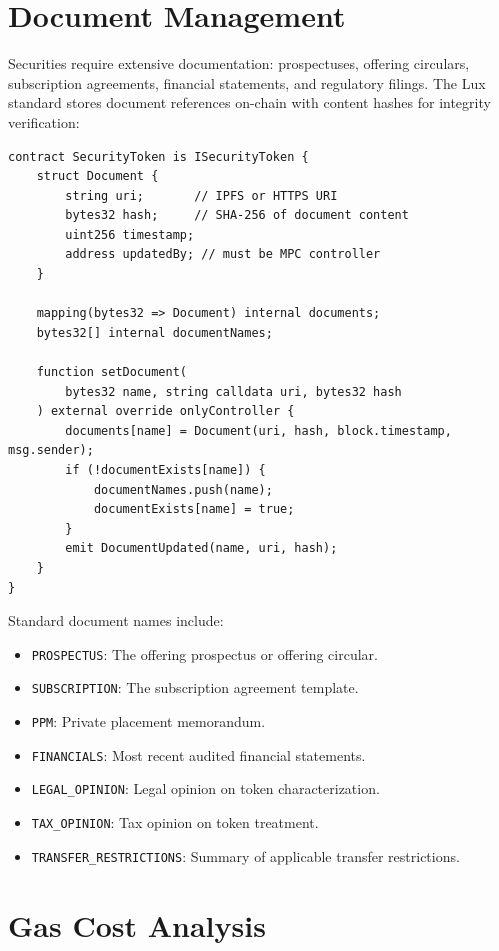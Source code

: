 \documentclass[11pt,a4paper]{article}
\begin{document}
\section{Document Management}\label{sec:documents}

Securities require extensive documentation: prospectuses, offering circulars, subscription agreements, financial statements, and regulatory filings. The Lux standard stores document references on-chain with content hashes for integrity verification:

\begin{lstlisting}[language=Solidity,caption={Document management.}]
contract SecurityToken is ISecurityToken {
    struct Document {
        string uri;       // IPFS or HTTPS URI
        bytes32 hash;     // SHA-256 of document content
        uint256 timestamp;
        address updatedBy; // must be MPC controller
    }

    mapping(bytes32 => Document) internal documents;
    bytes32[] internal documentNames;

    function setDocument(
        bytes32 name, string calldata uri, bytes32 hash
    ) external override onlyController {
        documents[name] = Document(uri, hash, block.timestamp, msg.sender);
        if (!documentExists[name]) {
            documentNames.push(name);
            documentExists[name] = true;
        }
        emit DocumentUpdated(name, uri, hash);
    }
}
\end{lstlisting}

Standard document names include:

\begin{itemize}[nosep]
  \item \texttt{PROSPECTUS}: The offering prospectus or offering circular.
  \item \texttt{SUBSCRIPTION}: The subscription agreement template.
  \item \texttt{PPM}: Private placement memorandum.
  \item \texttt{FINANCIALS}: Most recent audited financial statements.
  \item \texttt{LEGAL\_OPINION}: Legal opinion on token characterization.
  \item \texttt{TAX\_OPINION}: Tax opinion on token treatment.
  \item \texttt{TRANSFER\_RESTRICTIONS}: Summary of applicable transfer restrictions.
\end{itemize}

\section{Gas Cost Analysis}\label{sec:gas}
\end{document}
